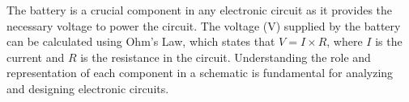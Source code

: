 The battery is a crucial component in any electronic circuit as it provides the necessary voltage to power the circuit. The voltage (V) supplied by the battery can be calculated using Ohm's Law, which states that \( V = I \times R \), where \( I \) is the current and \( R \) is the resistance in the circuit. Understanding the role and representation of each component in a schematic is fundamental for analyzing and designing electronic circuits.


